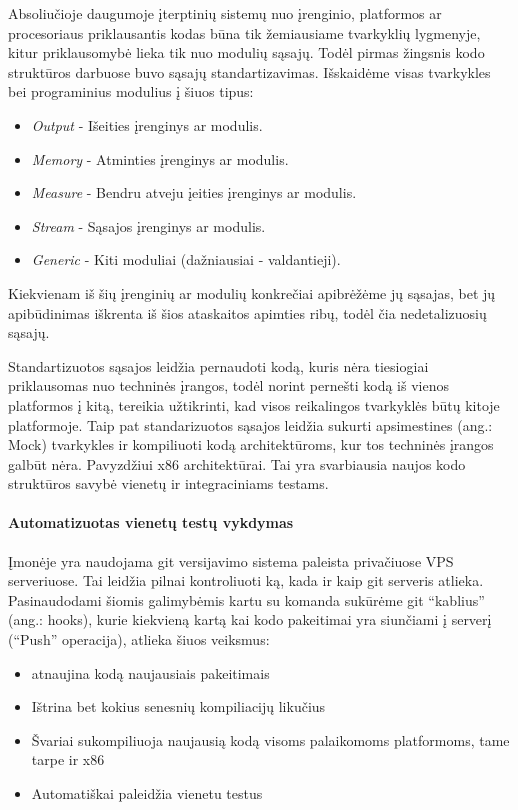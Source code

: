 \documentclass[12pt, a4paper, lithuanian, final]{article}
\begin{document}
Absoliučioje daugumoje įterptinių sistemų nuo įrenginio, platformos ar procesoriaus priklausantis kodas būna tik žemiausiame tvarkyklių lygmenyje, kitur priklausomybė lieka tik nuo modulių sąsajų.
Todėl pirmas žingsnis kodo struktūros darbuose buvo sąsajų standartizavimas.
Išskaidėme visas tvarkykles bei programinius modulius į šiuos tipus:
\begin{itemize}
	\item \textit{Output} - Išeities įrenginys ar modulis.
	\item \textit{Memory} - Atminties įrenginys ar modulis.
	\item \textit{Measure} - Bendru atveju įeities įrenginys ar modulis.
	\item \textit{Stream} - Sąsajos įrenginys ar modulis.
	\item \textit{Generic} - Kiti moduliai (dažniausiai - valdantieji).
\end{itemize}

Kiekvienam iš šių įrenginių ar modulių konkrečiai apibrėžėme jų sąsajas, bet jų apibūdinimas iškrenta iš šios ataskaitos apimties ribų, todėl čia nedetalizuosių sąsajų.


Standartizuotos sąsajos leidžia pernaudoti kodą, kuris nėra tiesiogiai priklausomas nuo techninės įrangos, todėl norint pernešti kodą iš vienos platformos į kitą, tereikia užtikrinti, kad visos reikalingos tvarkyklės būtų kitoje platformoje.
Taip pat standarizuotos sąsajos leidžia sukurti apsimestines (ang.: Mock) tvarkykles ir kompiliuoti kodą architektūroms, kur tos techninės įrangos galbūt nėra. Pavyzdžiui x86 architektūrai.
Tai yra svarbiausia naujos kodo struktūros savybė vienetų ir integraciniams testams.


\paragraph{Automatizuotas vienetų testų vykdymas}

Įmonėje yra naudojama git versijavimo sistema paleista privačiuose VPS serveriuose.
Tai leidžia pilnai kontroliuoti ką, kada ir kaip git serveris atlieka.
Pasinaudodami šiomis galimybėmis kartu su komanda sukūrėme git "`kablius"' (ang.: hooks), kurie kiekvieną kartą kai kodo pakeitimai yra siunčiami į serverį ("`Push"' operacija), atlieka šiuos veiksmus:
\begin{itemize}
	\item atnaujina kodą naujausiais pakeitimais
	\item Ištrina bet kokius senesnių kompiliacijų likučius
	\item Švariai sukompiliuoja naujausią kodą visoms palaikomoms platformoms, tame tarpe ir x86
	\item Automatiškai paleidžia vienetu testus
\end{itemize}
\end{document}

